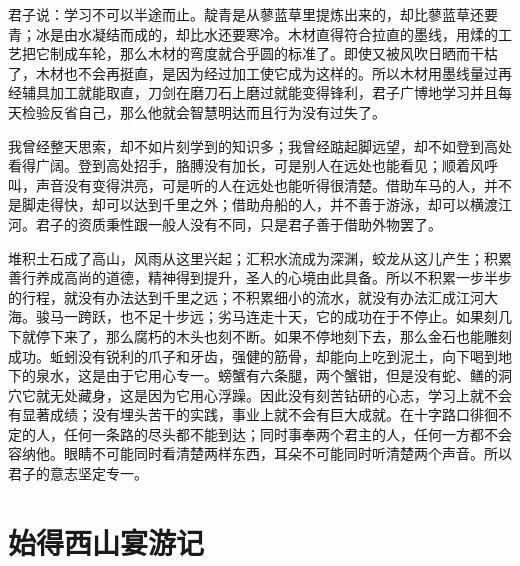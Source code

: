 \documentclass[12pt,UTF-8,openany]{ctexbook}
\begin{document}
\begin{normalsize}
    
    君子说：学习不可以半途而止。靛青是从蓼蓝草里提炼出来的，却比蓼蓝草还要青；冰是由水凝结而成的，却比水还要寒冷。木材直得符合拉直的墨线，用煣的工艺把它制成车轮，那么木材的弯度就合乎圆的标准了。即使又被风吹日晒而干枯了，木材也不会再挺直，是因为经过加工使它成为这样的。所以木材用墨线量过再经辅具加工就能取直，刀剑在磨刀石上磨过就能变得锋利，君子广博地学习并且每天检验反省自己，那么他就会智慧明达而且行为没有过失了。
    
    我曾经整天思索，却不如片刻学到的知识多；我曾经踮起脚远望，却不如登到高处看得广阔。登到高处招手，胳膊没有加长，可是别人在远处也能看见；顺着风呼叫，声音没有变得洪亮，可是听的人在远处也能听得很清楚。借助车马的人，并不是脚走得快，却可以达到千里之外；借助舟船的人，并不善于游泳，却可以横渡江河。君子的资质秉性跟一般人没有不同，只是君子善于借助外物罢了。
    
    堆积土石成了高山，风雨从这里兴起；汇积水流成为深渊，蛟龙从这儿产生；积累善行养成高尚的道德，精神得到提升，圣人的心境由此具备。所以不积累一步半步的行程，就没有办法达到千里之远；不积累细小的流水，就没有办法汇成江河大海。骏马一跨跃，也不足十步远；劣马连走十天，它的成功在于不停止。如果刻几下就停下来了，那么腐朽的木头也刻不断。如果不停地刻下去，那么金石也能雕刻成功。蚯蚓没有锐利的爪子和牙齿，强健的筋骨，却能向上吃到泥土，向下喝到地下的泉水，这是由于它用心专一。螃蟹有六条腿，两个蟹钳，但是没有蛇、鳝的洞穴它就无处藏身，这是因为它用心浮躁。因此没有刻苦钻研的心志，学习上就不会有显著成绩；没有埋头苦干的实践，事业上就不会有巨大成就。在十字路口徘徊不定的人，任何一条路的尽头都不能到达；同时事奉两个君主的人，任何一方都不会容纳他。眼睛不可能同时看清楚两样东西，耳朵不可能同时听清楚两个声音。所以君子的意志坚定专一。
    
\end{normalsize}



\chapter{始得西山宴游记}
\end{document}
